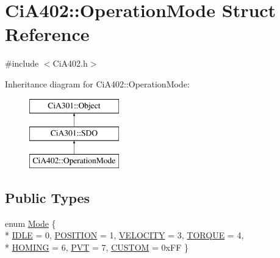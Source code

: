 \hypertarget{struct_ci_a402_1_1_operation_mode}{\section{Ci\-A402\-:\-:Operation\-Mode Struct Reference}
\label{struct_ci_a402_1_1_operation_mode}
}


{\ttfamily \#include $<$Ci\-A402.\-h$>$}

Inheritance diagram for Ci\-A402\-:\-:Operation\-Mode\-:\begin{figure}[H]
\begin{center}
\leavevmode
\includegraphics[height=3.000000cm]{dc/d80/struct_ci_a402_1_1_operation_mode}
\end{center}
\end{figure}
\subsection*{Public Types}
\begin{DoxyCompactItemize}
\item 
enum \hyperlink{struct_ci_a402_1_1_operation_mode_a0f19a6a20de54376f05e373ae42d39ba}{Mode} \{ \\*
\hyperlink{struct_ci_a402_1_1_operation_mode_a0f19a6a20de54376f05e373ae42d39baa6e0631b7a5c3c137e64a63f82e2d48fb}{I\-D\-L\-E} = 0, 
\hyperlink{struct_ci_a402_1_1_operation_mode_a0f19a6a20de54376f05e373ae42d39baaf7802cbda9a0a95f499c7da732229364}{P\-O\-S\-I\-T\-I\-O\-N} = 1, 
\hyperlink{struct_ci_a402_1_1_operation_mode_a0f19a6a20de54376f05e373ae42d39baac74e1cd4b8ee7c27ecf54a9f1233d4b5}{V\-E\-L\-O\-C\-I\-T\-Y} = 3, 
\hyperlink{struct_ci_a402_1_1_operation_mode_a0f19a6a20de54376f05e373ae42d39baaed391d5568bcc4f501bb6f51526500b9}{T\-O\-R\-Q\-U\-E} = 4, 
\\*
\hyperlink{struct_ci_a402_1_1_operation_mode_a0f19a6a20de54376f05e373ae42d39baa27f35fd6002ca49d9027f221f3010cf6}{H\-O\-M\-I\-N\-G} = 6, 
\hyperlink{struct_ci_a402_1_1_operation_mode_a0f19a6a20de54376f05e373ae42d39baa78df9f85a4912faaf130fdbf49b6b292}{P\-V\-T} = 7, 
\hyperlink{struct_ci_a402_1_1_operation_mode_a0f19a6a20de54376f05e373ae42d39baadd55f5e98b68f126e0e9e28c6219cbb8}{C\-U\-S\-T\-O\-M} = 0x\-F\-F
 \}
\end{DoxyCompactItemize}
